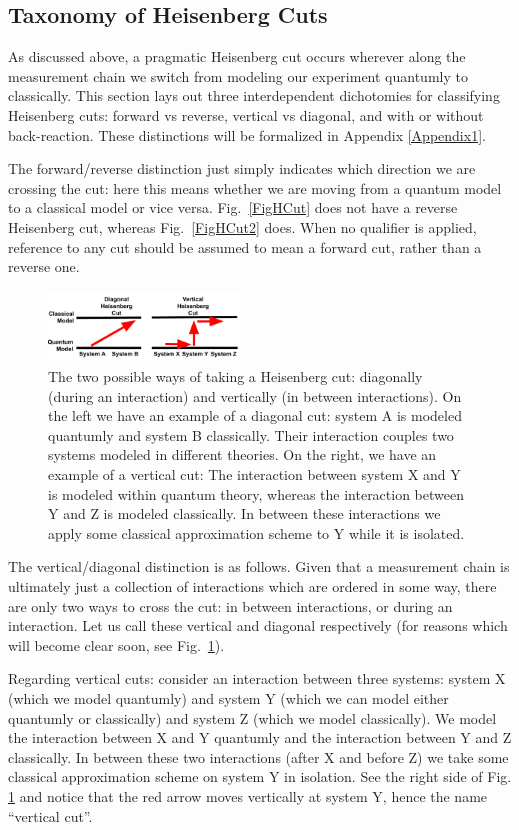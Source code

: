 \documentclass[12pt,prd,superscriptaddress,floatfix,amsmath,amssymb,amsfonts,nofootinbib]{revtex4-2}
\begin{document}
\subsection{Taxonomy of Heisenberg Cuts}
As discussed above, a pragmatic Heisenberg cut occurs wherever along the measurement chain we switch from modeling our experiment quantumly to classically. This section lays out three interdependent dichotomies for classifying Heisenberg cuts: forward vs reverse, vertical vs diagonal, and with or without back-reaction. These distinctions will be formalized in Appendix \ref{Appendix1}.

The forward/reverse distinction just simply indicates which direction we are crossing the cut: here this means whether we are moving from a quantum model to a classical model or vice versa. Fig.~\ref{FigHCut} does not have a reverse Heisenberg cut, whereas Fig.~\ref{FigHCut2} does. When no qualifier is applied, reference to any cut should be assumed to mean a forward cut, rather than a reverse one.

\begin{figure}
\includegraphics[width=0.45\textwidth]{Figures/DiagVsVert.pdf}
\caption{The two possible ways of taking a Heisenberg cut: diagonally (during an interaction) and vertically (in between interactions). On the left we have an example of a diagonal cut: system A is modeled quantumly and system B classically. Their interaction couples two systems modeled in different theories. On the right, we have an example of a vertical cut: The interaction between system X and Y is modeled within quantum theory, whereas the interaction between Y and Z is modeled classically. In between these interactions we apply some classical approximation scheme to Y while it is isolated.}\label{FigHCut3}
\end{figure}

The vertical/diagonal distinction is as follows. Given that a measurement chain is ultimately just a collection of interactions which are ordered in some way, there are only two ways to cross the cut: in between interactions, or during an interaction. Let us call these vertical and diagonal respectively (for reasons which will become clear soon, see Fig.~\ref{FigHCut3}). 

Regarding vertical cuts: consider an interaction between three systems: system X (which we model quantumly) and system Y (which we can model either quantumly or classically) and system Z (which we model classically). We model the interaction between X and Y quantumly and the interaction between Y and Z classically. In between these two interactions (after X and before Z) we take some classical approximation scheme on system Y in isolation. See the right side of Fig. \ref{FigHCut3} and notice that the red arrow moves vertically at system Y, hence the name ``vertical cut''.
\end{document}
